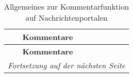 \begin{landscape} \footnotesize
	\begin{longtable}{l|p{170mm}}

  \caption{Allgemeines zur Kommentarfunktion auf Nachrichtenportalen} \\

& \bfseries Kommentare
  \\\hline
\endfirsthead

& \bfseries Kommentare \\\hline
\endhead


\hline \multicolumn{2}{r}{\emph{Fortsetzung auf der nächsten Seite}}
\endfoot

\hline
\endlastfoot


\end{longtable}
\end{landscape}
